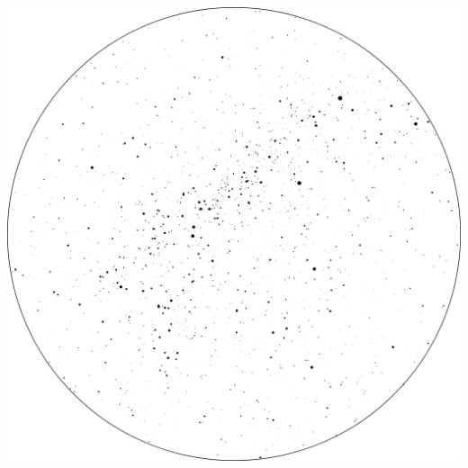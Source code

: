 \documentclass{SAS-class-skygen}
\begin{document}
	\vspace{0.5cm}
    \begin{center}
    \includegraphics[width=\textwidth]{./pics/sky_chart14.png}
    \end{center}
    
    
\end{document}
